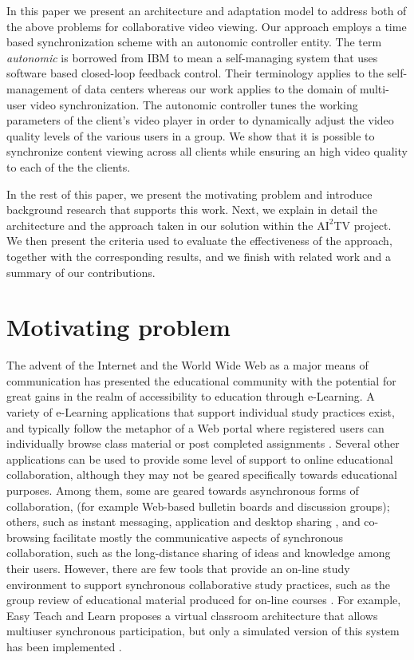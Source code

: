 \documentclass{sig-alternate}
\begin{document}
In this paper we present an architecture and adaptation model to
address both of the above problems for collaborative video viewing.
Our approach employs a time based synchronization scheme with an
autonomic controller entity.  The term \textit{autonomic} is borrowed
from IBM to mean a self-managing system that uses software based
closed-loop feedback control\cite{IBM}.  Their terminology applies to
the self-management of data centers whereas our work applies to the
domain of multi-user video synchronization.  The autonomic controller
tunes the working parameters of the client's video player in order to
dynamically adjust the video quality levels of the various users in a
group.  We show that it is possible to synchronize content viewing
across all clients while ensuring an high video quality to each of the
the clients.

In the rest of this paper, we present the motivating problem and
introduce background research that supports this work.  Next, we
explain in detail the architecture and the approach taken in our
solution within the $\mathrm{AI}^2$TV project.  We then present the
criteria used to evaluate the effectiveness of the approach, together
with the corresponding results, and we finish with related work and a
summary of our contributions.

\section{Motivating problem} \label{background}
The advent of the Internet and the World Wide Web as a major means of
communication has presented the educational community with the
potential for great gains in the realm of accessibility to education
through e-Learning.  A variety of e-Learning applications that support
individual study practices exist, and typically follow the metaphor of
a Web portal where registered users can individually browse class
material or post completed assignments \cite{PHOENIX,CAPELLA}.
Several other applications can be used to provide some level of
support to online educational collaboration, although they may not be
geared specifically towards educational purposes.  Among them, some
are geared towards asynchronous forms of collaboration, (for example
Web-based bulletin boards and discussion groups); others, such as
instant messaging, application and desktop sharing \cite{WEBEX, VNC},
and co-browsing \cite{CAPPS, LIEBERMAN, SIDLER} facilitate mostly the
communicative aspects of synchronous collaboration, such as the
long-distance sharing of ideas and knowledge among their users.
However, there are few tools that provide an on-line study environment
to support synchronous collaborative study practices, such as the
group review of educational material produced for on-line courses
\cite{WELLS}.  For example, Easy Teach and Learn proposes a virtual
classroom architecture that allows multiuser synchronous
participation, but only a simulated version of this system has been
implemented \cite{WALTER}.
\end{document}
